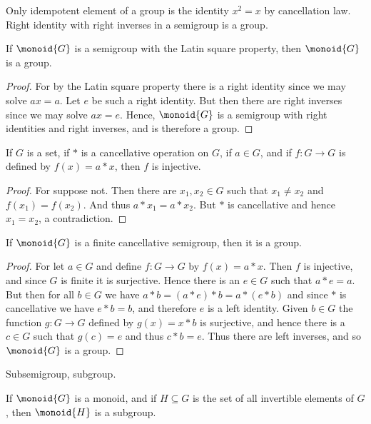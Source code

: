 \documentclass{book}                                                           %
\begin{document}
        Only idempotent element of a group is the identity $x^{2}=x$ by
        cancellation law. Right identity with right inverses in a semigroup
        is a group.
        \begin{theorem}
            If $\monoid{G}$ is a semigroup with the Latin square property,
            then $\monoid{G}$ is a group.
        \end{theorem}
        \begin{proof}
            For by the Latin square property there is a right identity since
            we may solve $ax=a$. Let $e$ be such a right identity. But then
            there are right inverses since we may solve $ax=e$. Hence,
            $\monoid{G}$ is a semigroup with right identities and right
            inverses, and is therefore a group.
        \end{proof}
        \begin{theorem}
            If $G$ is a set, if $*$ is a cancellative operation on $G$,
            if $a\in{G}$, and if $f:G\rightarrow{G}$ is defined by
            $f(x)=a*x$, then $f$ is injective.
        \end{theorem}
        \begin{proof}
            For suppose not. Then there are $x_{1},x_{2}\in{G}$ such that
            $x_{1}\ne{x}_{2}$ and $f(x_{1})=f(x_{2})$. And thus
            $a*x_{1}=a*x_{2}$. But $*$ is cancellative and hence
            $x_{1}=x_{2}$, a contradiction.
        \end{proof}
        \begin{theorem}
            If $\monoid{G}$ is a finite cancellative semigroup, then it is
            a group.
        \end{theorem}
        \begin{proof}
            For let $a\in{G}$ and define $f:G\rightarrow{G}$ by
            $f(x)=a*x$. Then $f$ is injective, and since $G$ is finite it is
            surjective. Hence there is an $e\in{G}$ such that $a*e=a$. But
            then for all $b\in{G}$ we have $a*b=(a*e)*b=a*(e*b)$ and since
            $*$ is cancellative we have $e*b=b$, and therefore $e$ is a
            left identity. Given $b\in{G}$ the function $g:G\rightarrow{G}$
            defined by $g(x)=x*b$ is surjective, and hence there is a
            $c\in{G}$ such that $g(c)=e$ and thus $c*b=e$. Thus there are
            left inverses, and so $\monoid{G}$ is a group.
        \end{proof}
        Subsemigroup, subgroup.
        \begin{theorem}
            If $\monoid{G}$ is a monoid, and if $H\subseteq{G}$ is the set
            of all invertible elements of $G$, then $\monoid{H}$ is a
            subgroup.
        \end{theorem}
\end{document}
